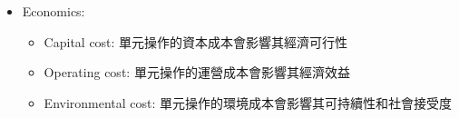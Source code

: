 \documentclass[../main.tex]{subfiles}
\begin{document}
\begin{itemize}
\begin{itemize}
\begin{itemize}
      \item energy requirements: 單元操作的能量需求會影響其經濟效益和環境影響
    \end{itemize}
    \item Economics:
    \begin{itemize}
      \item Capital cost: 單元操作的資本成本會影響其經濟可行性
      \item Operating cost: 單元操作的運營成本會影響其經濟效益
      \item Environmental cost: 單元操作的環境成本會影響其可持續性和社會接受度
    \end{itemize}
  \end{itemize}
\end{itemize}
\end{document}
